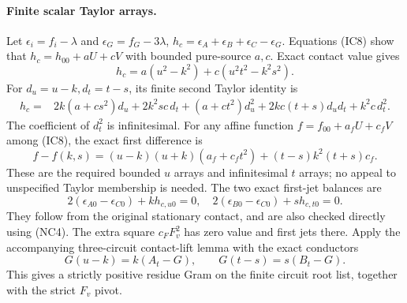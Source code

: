 \paragraph{Finite scalar Taylor arrays.}
Let $\epsilon_i=f_i-\lambda$ and $\epsilon_G=f_G-3\lambda$,
$h_c=\epsilon_A+\epsilon_B+\epsilon_C-\epsilon_G$.
Equations (IC8) show that $h_c=h_{00}+aU+cV$ with bounded
pure-source $a,c$. Exact contact value gives
\[
 h_c=a(u^2-k^2)+c(u^2t^2-k^2s^2).                     \tag{IC11}
\]
For $d_u=u-k,d_t=t-s$, its finite second Taylor identity is
\[
\begin{split}
 h_c={}&2k(a+cs^2)d_u+2k^2sc\,d_t
 +(a+ct^2)d_u^2+2kc(t+s)d_ud_t+k^2c\,d_t^2.            \end{split} \tag{IC12}
\]
The coefficient of $d_t^2$ is infinitesimal. For any affine function
$f=f_{00}+a_fU+c_fV$ among (IC8), the exact first difference is
\[
 f-f(k,s)=(u-k)(u+k)(a_f+c_ft^2)
                    +(t-s)k^2(t+s)c_f.                \tag{IC13}
\]
These are the required bounded $u$ arrays and infinitesimal $t$ arrays;
no appeal to unspecified Taylor membership is needed.
The two exact first-jet balances are
\[
 2(\epsilon_{A0}-\epsilon_{C0})+k h_{c,u0}=0,
 \quad 2(\epsilon_{B0}-\epsilon_{C0})+s h_{c,t0}=0.      \tag{IC14}
\]
They follow from the original stationary contact, and are also checked
directly using (NC4). The extra square $c_FF_v^2$ has zero value and
first jets there. Apply the accompanying three-circuit contact-lift
lemma with the exact conductors
\[
 G(u-k)=k(A_t-G),\qquad G(t-s)=s(B_t-G).                \tag{IC15}
\]
This gives a strictly positive residue Gram on the finite circuit
root list, together with the strict $F_v$ pivot.

